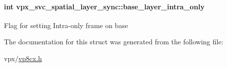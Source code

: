 \paragraph[{\texorpdfstring{base\+\_\+layer\+\_\+intra\+\_\+only}{base_layer_intra_only}}]{\setlength{\rightskip}{0pt plus 5cm}int vpx\+\_\+svc\+\_\+spatial\+\_\+layer\+\_\+sync\+::base\+\_\+layer\+\_\+intra\+\_\+only}\hypertarget{structvpx__svc__spatial__layer__sync_a35731bf99cd1bc7e52f5e3f84f9b22dc}{}\label{structvpx__svc__spatial__layer__sync_a35731bf99cd1bc7e52f5e3f84f9b22dc}
Flag for setting Intra-\/only frame on base 

The documentation for this struct was generated from the following file\+:\begin{DoxyCompactItemize}
\item 
vpx/\hyperlink{vp8cx_8h}{vp8cx.\+h}\end{DoxyCompactItemize}
